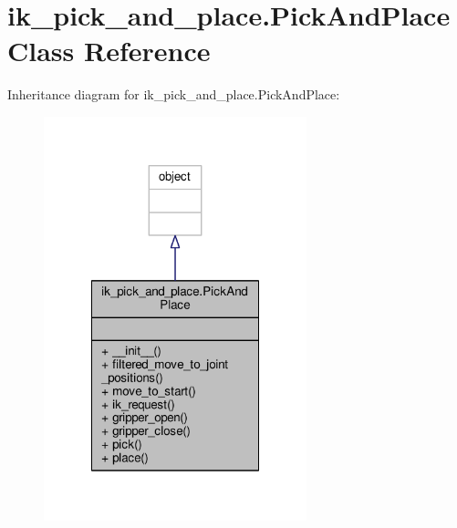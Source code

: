 \hypertarget{classik__pick__and__place_1_1_pick_and_place}{\section{ik\-\_\-pick\-\_\-and\-\_\-place.\-Pick\-And\-Place Class Reference}
\label{classik__pick__and__place_1_1_pick_and_place}
}


Inheritance diagram for ik\-\_\-pick\-\_\-and\-\_\-place.\-Pick\-And\-Place\-:\nopagebreak
\begin{figure}[H]
\begin{center}
\leavevmode
\includegraphics[width=216pt]{classik__pick__and__place_1_1_pick_and_place__inherit__graph}
\end{center}
\end{figure}


